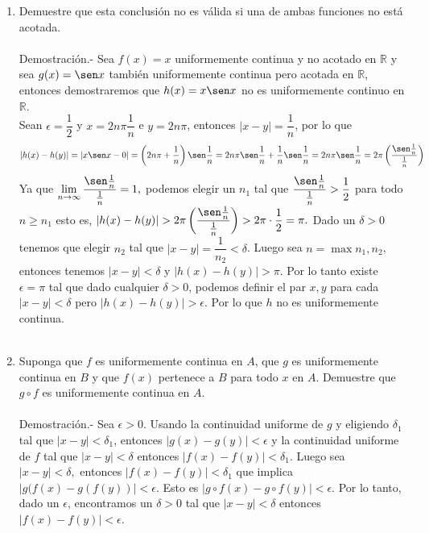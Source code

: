 \begin{enumerate}[\bfseries 1.]
\begin{enumerate}[\bfseries (a)]
	    \item Demuestre que esta conclusión no es válida si una de ambas funciones no está acotada.\\\\
		Demostración.-\; Sea $f(x)=x$ uniformemente continua y no acotado en $\mathbb{R}$ y sea $g(x)=\sen x$ también uniformemente continua pero acotada en $\mathbb{R}$, entonces demostraremos que $h(x)=x\sen x$ no es uniformemente continuo en $\mathbb{R}$.\\
		Sean $\epsilon=\dfrac{1}{2}$ y $x=2n\pi\dfrac{1}{n}$ e $y=2n\pi$, entonces $|x-y|=\dfrac{1}{n}$, por lo que 
		$$|h(x)-h(y)|=|x\sen x - 0|=\left(2n\pi + \dfrac{1}{n}\right)\sen \dfrac{1}{n} = 2n\pi \sen \dfrac{1}{n} + \dfrac{1}{n}\sen \dfrac{1}{n} = 2n\pi \sen \dfrac{1}{n} = 2\pi\left(\dfrac{\sen \frac{1}{n}}{\frac{1}{n}}\right)$$
		Ya que $\lim\limits_{n\to \infty}\dfrac{\sen\frac{1}{n}}{\frac{1}{n}} = 1,$ podemos elegir un $n_1$ tal que $\dfrac{\sen \frac{1}{n}}{\frac{1}{n}}>\dfrac{1}{2}$ para todo $n\geq n_1$ esto es, $|h(x)-h(y)|>2\pi\left(\dfrac{\sen \frac{1}{n}}{\frac{1}{n}}\right)>2\pi\cdot \dfrac{1}{2}=\pi.$ Dado un $\delta>0$ tenemos que elegir $n_2$ tal que $|x-y|=\dfrac{1}{n_2}<\delta$. Luego sea $n=\max{n_1,n_2}$, entonces tenemos $|x-y|<\delta$ y $|h(x)-h(y)|>\pi.$ Por lo tanto existe $\epsilon=\pi$ tal que dado cualquier $\delta>0$, podemos definir el par $x,y$ para cada $|x-y|<\delta$ pero $|h(x)-h(y)|>\epsilon.$ Por lo que $h$ no es uniformemente continua.\\\\


	    \item Suponga que $f$ es uniformemente continua en $A$, que $g$ es uniformemente continua en $B$ y que $f(x)$ pertenece a $B$ para todo $x$ en $A$. Demuestre que $g\circ f$ es uniformemente continua en $A$.\\\\
		Demostración.-\; Sea $\epsilon > 0$. Usando la continuidad uniforme de $g$ y eligiendo $\delta_1$ tal que $|x-y|<\delta_1$, entonces $|g(x)-g(y)|<\epsilon$ y la continuidad uniforme de $f$ tal que $|x-y|<\delta$ entonces $|f(x)-f(y)|<\delta_1$. Luego sea $|x-y|<\delta,$ entonces $|f(x)-f(y)|<\delta_1$ que implica $|g(f(x)-g(f(y))|<\epsilon$. Esto es $|g\circ f(x)-g\circ f(y)|<\epsilon.$ Por lo tanto, dado un $\epsilon$, encontramos un $\delta>0$ tal que $|x-y|<\delta$ entonces $|f(x)-f(y)|<\epsilon$.\\\\


\end{enumerate}
\end{enumerate}
